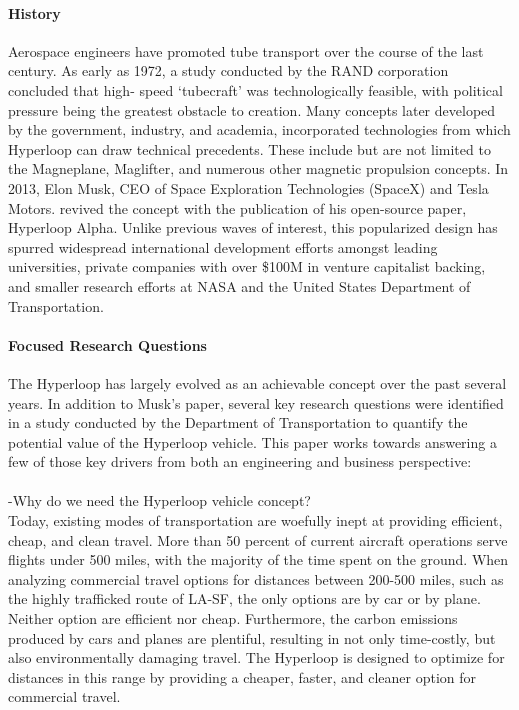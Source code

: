 \paragraph{History}

	Aerospace engineers have promoted tube transport over the course of the
	last century. As early as 1972, a study conducted by the RAND corporation concluded that high-
	speed `tubecraft' was technologically feasible, with political pressure being the greatest
	obstacle to creation.\cite{RAND} Many concepts later developed by
	the government, industry, and academia, incorporated technologies from which
	Hyperloop can draw technical precedents.
	These include but are not limited to the Magneplane, Maglifter, and numerous
	other magnetic propulsion concepts. In 2013, Elon Musk, CEO of Space Exploration
	Technologies (SpaceX) and Tesla Motors.\cite{Musk} revived the concept with the publication
	of his open-source paper, Hyperloop Alpha.\cite{Musk}
	Unlike previous waves of interest, this popularized design has spurred widespread international
	development efforts amongst leading universities, private companies with over
	\$100M in venture capitalist backing, and smaller research efforts at NASA and the
	United States Department of Transportation. \cite{Chin}

\paragraph{Focused Research Questions}

	The Hyperloop has largely evolved as an achievable concept over the past several years.
	In addition to Musk's paper, several key research questions were identified in a study conducted
	by the Department of Transportation to quantify the potential value of the
	Hyperloop vehicle. \cite{Volpe} This paper works towards answering a few of
	those key drivers from both an engineering and business perspective:\\

	\\
	-Why do we need the Hyperloop vehicle concept?\\

	Today, existing modes of transportation are woefully inept at providing efficient, cheap, and
	clean travel. More than 50 percent of current aircraft operations serve flights under 500
	miles, with the majority of the time spent on the ground. When analyzing commercial
	travel options for distances between 200-500 miles, such as the highly trafficked route of LA-SF,
	the only options are by car or by plane. Neither option are efficient nor cheap. Furthermore,
	the carbon emissions produced by cars and planes are plentiful, resulting in not only
	time-costly, but also environmentally damaging travel. The Hyperloop is designed to
	optimize for distances in this range by providing a cheaper, faster, and cleaner
	option for commercial travel.

